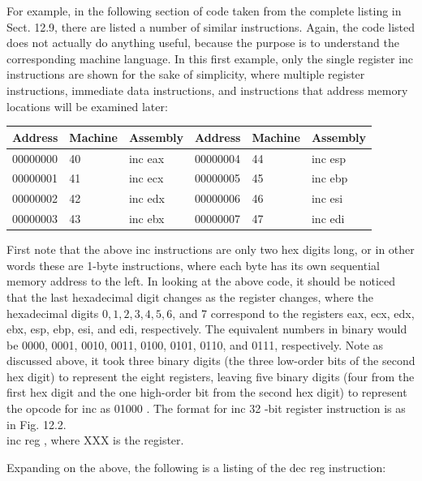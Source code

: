 \documentclass[10pt]{article}
\begin{document}
For example, in the following section of code taken from the complete listing in Sect. 12.9, there are listed a number of similar instructions. Again, the code listed does not actually do anything useful, because the purpose is to understand the corresponding machine language. In this first example, only the single register inc instructions are shown for the sake of simplicity, where multiple register instructions, immediate data instructions, and instructions that address memory locations will be examined later:

\begin{center}
\begin{tabular}{|l|l|l|l|l|l|}
\hline
Address & Machine & Assembly & Address & Machine & Assembly \\
\hline
00000000 & 40 & inc eax & 00000004 & 44 & inc esp \\
\hline
00000001 & 41 & inc ecx & 00000005 & 45 & inc ebp \\
\hline
00000002 & 42 & inc edx & 00000006 & 46 & inc esi \\
\hline
00000003 & 43 & inc ebx & 00000007 & 47 & inc edi \\
\hline
\end{tabular}
\end{center}

First note that the above inc instructions are only two hex digits long, or in other words these are 1-byte instructions, where each byte has its own sequential memory address to the left. In looking at the above code, it should be noticed that the last hexadecimal digit changes as the register changes, where the hexadecimal digits $0,1,2,3,4,5,6$, and 7 correspond to the registers eax, ecx, edx, ebx, esp, ebp, esi, and edi, respectively. The equivalent numbers in binary would be 0000, 0001, 0010, 0011, 0100, 0101, 0110, and 0111, respectively. Note as discussed above, it took three binary digits (the three low-order bits of the second hex digit) to represent the eight registers, leaving five binary digits (four from the first hex digit and the one high-order bit from the second hex digit) to represent the opcode for inc as 01000 . The format for inc 32 -bit register instruction is as in Fig. 12.2.\\
inc reg , where XXX is the register.

Expanding on the above, the following is a listing of the dec reg instruction:
\end{document}
